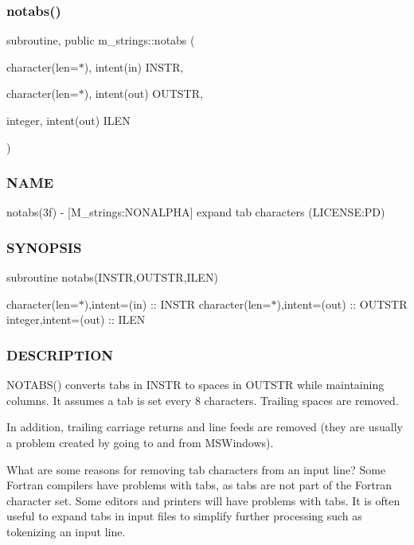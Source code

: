 \subsubsection{\texorpdfstring{notabs()}{notabs()}}
{\footnotesize\ttfamily subroutine, public m\+\_\+strings\+::notabs (\begin{DoxyParamCaption}\item[{character(len=$\ast$), intent(in)}]{I\+N\+S\+TR,  }\item[{character(len=$\ast$), intent(out)}]{O\+U\+T\+S\+TR,  }\item[{integer, intent(out)}]{I\+L\+EN }\end{DoxyParamCaption})}



\subsubsection*{N\+A\+ME}

notabs(3f) -\/ \mbox{[}M\+\_\+strings\+:N\+O\+N\+A\+L\+P\+HA\mbox{]} expand tab characters (L\+I\+C\+E\+N\+SE\+:PD) \subsubsection*{S\+Y\+N\+O\+P\+S\+IS}

subroutine notabs(\+I\+N\+S\+T\+R,\+O\+U\+T\+S\+T\+R,\+I\+L\+E\+N)

character(len=$\ast$),intent=(in) \+:\+: I\+N\+S\+TR character(len=$\ast$),intent=(out) \+:\+: O\+U\+T\+S\+TR integer,intent=(out) \+:\+: I\+L\+EN \subsubsection*{D\+E\+S\+C\+R\+I\+P\+T\+I\+ON}

N\+O\+T\+A\+B\+S() converts tabs in I\+N\+S\+TR to spaces in O\+U\+T\+S\+TR while maintaining columns. It assumes a tab is set every 8 characters. Trailing spaces are removed.

In addition, trailing carriage returns and line feeds are removed (they are usually a problem created by going to and from M\+S\+Windows).

What are some reasons for removing tab characters from an input line? Some Fortran compilers have problems with tabs, as tabs are not part of the Fortran character set. Some editors and printers will have problems with tabs. It is often useful to expand tabs in input files to simplify further processing such as tokenizing an input line.

